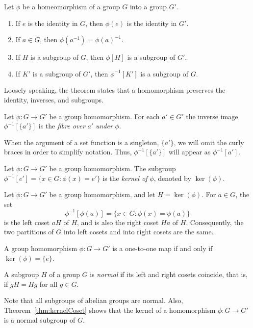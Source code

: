 \begin{theorem}\label{thm:homoPreservation}
Let $\phi$ be a homeomorphism of a group $G$ into a group $G'$.
\begin{enumerate}
\item If $e$ is the identity in $G$, then $\phi(e)$ is the identity in
$G'$. 
\item If $a\in G$, then $\phi(a^{-1}) = \phi(a)^{-1}$.
\item If $H$ is a subgroup of $G$, then $\phi[H]$ is a subgroup of
$G'$.
\item If $K'$ is a subgroup of $G'$, then $\phi^{-1}[K']$ is a
subgroup of $G$. 
\end{enumerate}
\end{theorem}
Loosely speaking, the theorem states that a homomorphism preserves the
identity, inverses, and subgroups.
\begin{definition}[Fibre]
Let $\phi:G\to G'$ be a group homomorphism.  For each $a' \in
G'$ the inverse image $\phi^{-1}[\{a'\}]$ is the \emph{fibre over}
$a'$ \emph{under} $\phi$.
\end{definition}
When the argument of a set function is a singleton, \eg $\{a'\}$, we
will omit the curly braces in order to simplify notation.  Thus,
$\phi^{-1}[\{a'\}]$ will appear as $\phi^{-1}[a']$.  
\begin{definition}[Kernel]
Let $\phi:G\to G'$ be a group homomorphism.  The subgroup
$\phi^{-1}[e'] = \{x\in G: \phi(x) = e'\}$ is the \emph{kernel of}
$\phi$, denoted by $\ker(\phi)$.
\end{definition}

\begin{theorem}\label{thm:kernelCoset}
Let $\phi: G\to G'$ be a group homomorphism, and let $H =
\ker(\phi)$. For $a\in G$, the set 
\[
\phi^{-1}[\phi(a)] = \{x\in G: \phi(x) = \phi(a)\}
\]
is the left coset $aH$ of $H$, and is also the right coset $Ha$ of
$H$.  Consequently, the two partitions of $G$ into left cosets and
into right cosets are the same.
\end{theorem}
\begin{corollary}
A group homomorphism $\phi:G\to G'$ is a one-to-one map if and
only if $\ker(\phi) = \{e\}$.
\end{corollary}

\begin{definition} 
A subgroup $H$ of a group $G$ is \emph{normal} if its left and right
cosets coincide, that is, if $gH = Hg$ for all $g\in G$.
\end{definition}
Note that all subgroups of abelian groups are normal.  Also,
Theorem~\ref{thm:kernelCoset} shows that the kernel of a homomorphism
$\phi: G \to G'$ is a normal subgroup of $G$.

